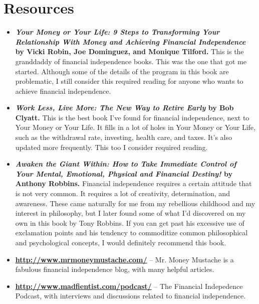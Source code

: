 \newpage
\section{Resources}
\begin{itemize}
\item \textbf{\emph{Your Money or Your Life: 9 Steps to Transforming Your Relationship With Money and Achieving Financial Independence} by Vicki Robin, Joe Dominguez, and Monique Tilford.} This is the granddaddy of financial independence books. This was the one that got me started. Although some of the details of the program in this book are problematic, I still consider this required reading for anyone who wants to achieve financial independence.

\item \textbf{\emph{Work Less, Live More: The New Way to Retire Early} by Bob Clyatt.} This is the best book I've found for financial independence, next to Your Money or Your Life. It fills in a lot of holes in Your Money or Your Life, such as the withdrawal rate, investing, health care, and taxes. It's also updated more frequently. This too I consider required reading.

\item \textbf{\emph{Awaken the Giant Within: How to Take Immediate Control of Your Mental, Emotional, Physical and Financial Destiny!} by Anthony Robbins.} Financial independence requires a certain attitude that is not very common. It requires a lot of creativity, determination, and awareness. These came naturally for me from my rebellious childhood and my interest in philosophy, but I later found some of what I'd discovered on my own in this book by Tony Robbins. If you can get past his excessive use of exclamation points and his tendency to commoditize common philosophical and psychological concepts, I would definitely recommend this book.

\item \textbf{\url{http://www.mrmoneymustache.com/}} -- Mr. Money Mustache is a fabulous financial independence blog, with many helpful articles.

\item \textbf{\url{http://www.madfientist.com/podcast/}} -- The Financial Indepedence Podcast, with interviews and discussions related to financial independence.
\end{itemize}
